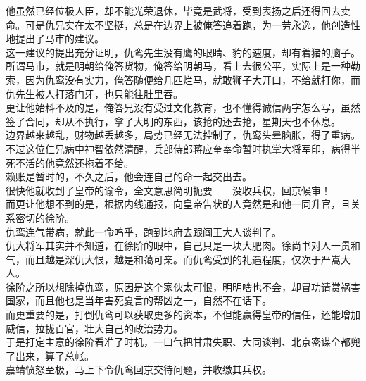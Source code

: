 \begin{multicols}{\theparacolNo}
他虽然已经位极人臣，却不能光荣退休，毕竟是武将，受到表扬之后还得回去卖命。可是仇兄实在太不坚挺，总是在边界上被俺答追着跑，为一劳永逸，他创造性地提出了马市的建议。\\

这一建议的提出充分证明，仇鸾先生没有鹰的眼睛、豹的速度，却有着猪的脑子。\\

所谓马市，就是明朝给俺答货物，俺答给明朝马，看上去很公平，实际上是一种勒索，因为仇鸾没有实力，俺答随便给几匹烂马，就敢狮子大开口，不给就打你，而仇先生被人打落门牙，也只能往肚里吞。\\

更让他始料不及的是，俺答兄没有受过文化教育，也不懂得诚信两字怎么写，虽然签了合同，却从不执行，拿了大明的东西，该抢的还去抢，星期天也不休息。\\

边界越来越乱，财物越丢越多，局势已经无法控制了，仇鸾头晕脑胀，得了重病。不过这位仁兄病中神智依然清醒，兵部侍郎蒋应奎奉命暂时执掌大将军印，病得半死不活的他竟然还拖着不给。\\

赖账是暂时的，不久之后，他会连自己的命一起交出去。\\

很快他就收到了皇帝的谕令，全文意思简明扼要——没收兵权，回京候审！\\

而更让他想不到的是，根据内线通报，向皇帝告状的人竟然是和他一同升官，且关系密切的徐阶。\\

仇鸾连气带病，就此一命呜乎，跑到地府去跟阎王大人谈判了。\\

仇大将军其实并不知道，在徐阶的眼中，自己只是一块大肥肉。徐尚书对人一贯和气，而且越是深仇大恨，越是和蔼可亲。而仇鸾受到的礼遇程度，仅次于严嵩大人。\\

徐阶之所以想除掉仇鸾，原因是这个家伙太可恨，明明啥也不会，却冒功请赏祸害国家，而且他也是当年害死夏言的帮凶之一，自然不在话下。\\

而更重要的是，打倒仇鸾可以获取更多的资本，不但能赢得皇帝的信任，还能增加威信，拉拢百官，壮大自己的政治势力。\\

于是打定主意的徐阶看准了时机，一口气把甘肃失职、大同谈判、北京密谋全都兜了出来，算了总帐。\\

嘉靖愤怒至极，马上下令仇鸾回京交待问题，并收缴其兵权。\\


\end{multicols}
